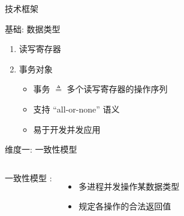 \begin{frame}{技术框架}
\end{frame}
\begin{frame}{基础: 数据类型}
	\begin{enumerate}
	  \setlength{\itemsep}{8pt}
	  \item 读写寄存器
	  \item 事务对象
		\begin{itemize}
		  \setlength{\itemsep}{4pt}
		  \item 事务 $\triangleq$ 多个读写寄存器的操作序列
		  \item 支持 ``all-or-none'' 语义
		  \item 易于开发并发应用
		\end{itemize}
	\end{enumerate}
\end{frame}
\begin{frame}{维度一: 一致性模型}
  \begin{columns}
	  一致性模型  :
	  \vspace{0.20cm}
	  \begin{itemize}
		\item 多进程并发操作某数据类型
		\item 规定各操作的合法返回值
	  \end{itemize}
  \end{columns}

\end{frame}
